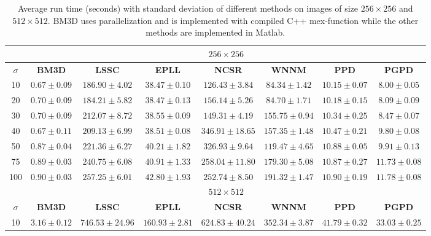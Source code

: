 \begin{table*}
\vspace{-0.15in}
\caption{Average run time (seconds) with standard deviation of different methods on images of size $256\times 256$ and $512\times 512$. BM3D uses parallelization and is implemented with compiled C++ mex-function while the other methods are implemented in Matlab.}
\vspace{-0.13in}
\label{tab2}
\scriptsize
\begin{center}
\begin{tabular}{|c||c|c|c|c|c|c|c|}
\hline
&\multicolumn{7}{c|}{ $256 \times 256$}
\\
\hline
\hline
$\sigma$ &\textbf{BM3D}&\textbf{LSSC}&\textbf{EPLL}&\textbf{NCSR}&\textbf{WNNM}&\textbf{PPD}&\textbf{PGPD} 
\\
\hline
10  & $0.67\pm 0.09$  & $186.90\pm4.02$  & $38.47\pm0.10 $   & $126.43\pm3.84$   & $84.34\pm1.42$ &$10.15\pm0.07$ & $8.00\pm0.05$  
\\
\hline
20  &  $0.70\pm0.09$  & $184.21\pm5.82$   & $38.47\pm0.13$   &  $156.14\pm5.26$  &  $84.70\pm1.71$&$10.18\pm0.15$  &  $8.09\pm 0.09$             
\\
\hline 
30    &  $0.70 \pm 0.09$  &  $212.07\pm8.72$  & $38.55\pm0.09$  &  $149.31\pm4.19$  &  $155.75\pm0.94$ &$10.34\pm0.25$ &  $8.47\pm0.07$            
\\
\hline
40   &  $0.67\pm0.11$  &$209.13\pm6.99$ &  $38.51\pm0.08$  &  $346.91\pm18.65$  &  $157.35\pm1.48$&$10.47\pm0.21$  & $9.80\pm0.08$            
\\
\hline
50  &  $0.87\pm0.04$  &  $221.36\pm6.27$  &  $40.21\pm1.82 $  &  $326.93\pm9.64$  & $119.47\pm4.65$&$10.88\pm0.05$    &  $9.91\pm0.13$     
\\
\hline
75    & $0.89\pm0.03$ &  $240.75\pm6.08$  &   $40.91\pm1.33$ &  $258.04\pm11.80$  & $ 179.30\pm5.08$ &$10.87\pm0.27$  &   $11.73\pm0.08$  
\\
\hline
100  &  $0.90\pm0.03$  &  $257.25\pm6.01 $  &$42.80\pm 1.93$  & $252.74\pm8.50$   &  $191.32\pm 1.47$  &$10.90\pm0.19$ &  $11.78\pm0.08$     
\\
\hline
\hline
&\multicolumn{7}{c|}{ $512 \times 512$}
\\
\hline
\hline
$\sigma$ &\textbf{BM3D}&\textbf{LSSC}&\textbf{EPLL}&\textbf{NCSR}&\textbf{WNNM}&\textbf{PPD}&\textbf{PGPD} 
\\
\hline
10  &$3.16\pm0.12$ & $746.53\pm24.96$  &  $160.93\pm2.81$  & $624.83\pm40.24$   &  $352.34\pm3.87$&$41.79\pm0.32$  &  $33.03\pm0.25$   
\\

\end{tabular}
\end{center}
\end{table*}
